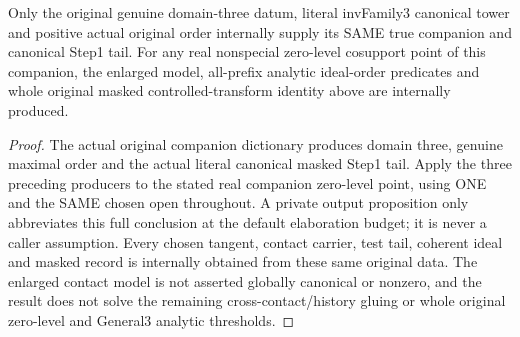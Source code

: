 \begin{theorem}
\label{hir:zero-contact-original-general-three-consumer}
Only the original genuine domain-three datum, literal invFamily3 canonical
tower and positive actual original order internally supply its SAME true
companion and canonical Step1 tail. For any real nonspecial zero-level
cosupport point of this companion, the enlarged model, all-prefix analytic
ideal-order predicates and whole original masked controlled-transform
identity above are internally produced.
\end{theorem}
\leanok
\begin{proof}
The actual original companion dictionary produces domain three, genuine
maximal order and the actual literal canonical masked Step1 tail. Apply the
three preceding producers to the stated real companion zero-level point, using
ONE and the SAME chosen open throughout. A private output proposition only
abbreviates this full conclusion at the default elaboration budget; it is
never a caller assumption.
Every chosen tangent, contact carrier, test tail, coherent ideal and masked
record is internally obtained from these same original data. The enlarged
contact model is not asserted globally canonical or nonzero, and the
result does not solve the remaining cross-contact/history gluing or whole
original zero-level and General3 analytic thresholds.
\end{proof}
